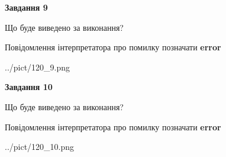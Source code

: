 \documentclass[12pt, ukrainian]{article}
\begin{document}
{{\begin {center}\textbf{Завдання 9}\end {center}}\par
Що буде виведено за виконання? \par
Повідомлення інтерпретатора про помилку позначати \textbf{error}

\begin{center}
	{../pict/120_9.png}
\end{center}
\newpage

{\begin {center}\textbf{Завдання 10}\end {center}}\par
Що буде виведено за виконання? \par
Повідомлення інтерпретатора про помилку позначати \textbf{error}

\begin{center}
	{../pict/120_10.png}
\end{center}
\newpage

}
\end{document}
